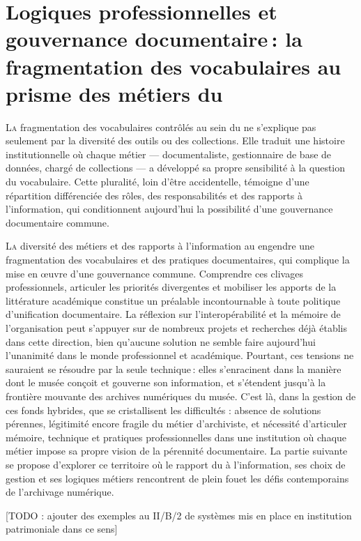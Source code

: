\chapter[Diversité des métiers et fragmentation documentaire]{\label{II-B}Logiques professionnelles et gouvernance documentaire : la fragmentation des vocabulaires au prisme des métiers du \mae}

\lettrine{L}a fragmentation des vocabulaires contrôlés au sein du \maelong ne s'explique pas seulement par la diversité des outils ou des collections. Elle traduit une histoire institutionnelle où chaque métier — documentaliste, gestionnaire de base de données, chargé de collections — a développé sa propre sensibilité à la question du vocabulaire. Cette pluralité, loin d'être accidentelle, témoigne d'une répartition différenciée des rôles, des responsabilités et des rapports à l'information, qui conditionnent aujourd'hui la possibilité d'une gouvernance documentaire commune.




\bigskip
\bigskip
\bigskip

\lettrine{L}{a} diversité des métiers et des rapports à l'information au \mae engendre une fragmentation des vocabulaires et des pratiques documentaires, qui complique la mise en œuvre d'une gouvernance commune. Comprendre ces clivages professionnels, articuler les priorités divergentes et mobiliser les apports de la littérature académique constitue un préalable incontournable à toute politique d'unification documentaire. La réflexion sur l'interopérabilité et la mémoire de l'organisation peut s'appuyer sur de nombreux projets et recherches déjà établis dans cette direction, bien qu'aucune solution ne semble faire aujourd'hui l'unanimité dans le monde professionnel et académique. Pourtant, ces tensions ne sauraient se résoudre par la seule technique : elles s’enracinent dans la manière dont le musée conçoit et gouverne son information, et s’étendent jusqu’à la frontière mouvante des archives numériques du musée. C’est là, dans la gestion de ces fonds hybrides, que se cristallisent les difficultés : absence de solutions pérennes, légitimité encore fragile du métier d’archiviste, et nécessité d’articuler mémoire, technique et pratiques professionnelles dans une institution où chaque métier impose sa propre vision de la pérennité documentaire. La partie suivante se propose d’explorer ce territoire où le rapport du \mae à l’information, ses choix de gestion et ses logiques métiers rencontrent de plein fouet les défis contemporains de l’archivage numérique.

[TODO : ajouter des exemples au II/B/2 de systèmes mis en place en institution patrimoniale dans ce sens]
